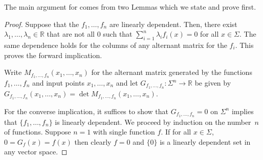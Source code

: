\documentclass[a4paper,UKenglish,cleveref, autoref,mathscr]{lipics-v2019}
\newcommand{\RR}{\mathbb{R}}
\newcommand{\1}{\mathbbm{1}}
\begin{document}
The main argument for  comes from two Lemmas which we state and prove first.


\alternantexistence*

\begin{proof}
	Suppose that the $f_1, \dots, f_n$ are linearly dependent. Then, there exist $\lambda_1, \dots, \lambda_n \in \RR$ that are not all $0$ such that $\sum_{i = 1}^n \lambda_i f_i(x) = 0$ for all $x \in \Sigma$. The same dependence holds for the columns of any alternant matrix for the $f_i$. This proves the forward implication.
	
	Write $M_{f_1, \dots, f_n}(x_1, \dots, x_n)$ for the alternant matrix generated by the functions $f_1, \dots, f_n$ and input points $x_1, \dots, x_n$ and let $G_{f_1, \dots, f_n} : \Sigma^n \rightarrow \RR$ be given by $G_{f_1, \dots, f_n}(x_1, \dots, x_n) = \det M_{f_1, \dots, f_n}(x_1, \dots, x_n)$.
	
	
	For the converse implication, it suffices to show that $G_{f_1, \dots, f_n} = 0$ on $\Sigma^n$ implies that $\{f_1, \dots, f_n\}$ is linearly dependent. We proceed by induction on the number~$n$ of functions. Suppose $n = 1$ with single function $f$. If for all $x \in \Sigma$, $0 = G_f(x) = f(x)$ then clearly $f = 0$ and $\{0\}$ is a linearly dependent set in any vector space.
	

\end{proof}
\end{document}
